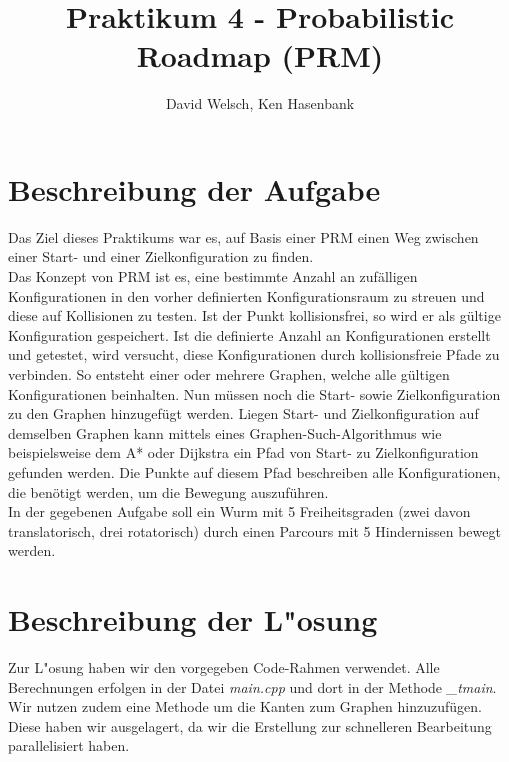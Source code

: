 \documentclass[a4paper]{scrartcl}
\begin{document}
\titlehead{Wintersemester 2017/2018\\Motion Planning\\Prof. Horsch, Rudi Scheitler}
\author{David Welsch, Ken Hasenbank}
\title{Praktikum 4 - Probabilistic Roadmap (PRM)}
\maketitle

\section*{Beschreibung der Aufgabe}

Das Ziel dieses Praktikums war es, auf Basis einer PRM einen Weg zwischen einer Start- und einer Zielkonfiguration zu finden. \\

Das Konzept von PRM ist es, eine bestimmte Anzahl an zufälligen Konfigurationen in den vorher definierten Konfigurationsraum zu streuen und diese auf Kollisionen zu testen. Ist der Punkt kollisionsfrei, so wird er als gültige Konfiguration gespeichert. Ist die definierte Anzahl an Konfigurationen erstellt und getestet, wird versucht, diese Konfigurationen durch kollisionsfreie Pfade zu verbinden. So entsteht einer oder mehrere Graphen, welche alle gültigen Konfigurationen beinhalten. Nun müssen noch die Start- sowie  Zielkonfiguration zu den Graphen hinzugefügt werden. Liegen Start- und Zielkonfiguration auf demselben Graphen kann mittels eines Graphen-Such-Algorithmus wie beispielsweise dem A* oder Dijkstra ein Pfad von Start- zu Zielkonfiguration gefunden werden. Die Punkte auf diesem Pfad beschreiben alle Konfigurationen, die benötigt werden, um die Bewegung auszuführen. \\

In der gegebenen Aufgabe soll ein Wurm mit 5 Freiheitsgraden (zwei davon translatorisch, drei rotatorisch) durch einen Parcours mit 5 Hindernissen bewegt werden.

\section*{Beschreibung der L"osung}

Zur L"osung haben wir den vorgegeben Code-Rahmen verwendet. Alle Berechnungen erfolgen in der Datei \textit{main.cpp} und dort in der Methode \textit{\_tmain}. Wir nutzen zudem eine Methode um die Kanten zum Graphen hinzuzufügen. Diese haben wir ausgelagert, da wir die Erstellung zur schnelleren Bearbeitung parallelisiert haben.\\
\end{document}
